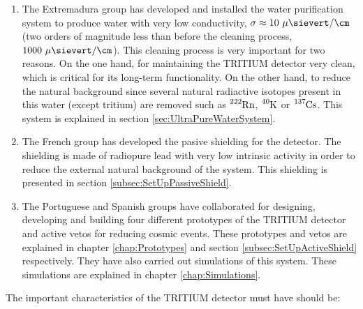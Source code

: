 \begin{enumerate}
\item{} The Extremadura group has developed and installed the water purification system to produce water with very low conductivity, $\sigma \approx 10~\mu\sievert/\cm$ (two orders of magnitude less than before the cleaning process, $1000~\mu\sievert/\cm$). This cleaning process is very important for two reasons. On the one hand, for maintaining the TRITIUM detector very clean, which is critical for its long-term functionality. On the other hand, to reduce the natural background since several natural radiactive isotopes present in this water (except tritium) are removed such as $\ce{^{222}Rn}$, $\ce{^{40}K}$ or $\ce{^{137}Cs}$. This system is explained in section \ref{sec:UltraPureWaterSystem}.

\item{} The French group has developed the pasive shielding for the detector. The shielding is made of radiopure lead with very low intrinsic activity in order to reduce the external natural background of the system. This shielding is presented in section \ref{subsec:SetUpPassiveShield}.

\item{} The Portuguese and Spanish groups have collaborated for designing, developing and building four different prototypes of the TRITIUM detector and active vetos for reducing cosmic events. These prototypes and vetos are explained in chapter \ref{chap:Prototypes} and section \ref{subsec:SetUpActiveShield} respectively. They have also carried out simulations of this system. These simulations are explained in chapter \ref{chap:Simulations}.

\end{enumerate}

The important characteristics of the TRITIUM detector must have should be:

